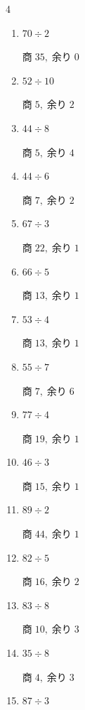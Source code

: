 \begin{multicols}{4}
\begin{enumerate}
        $商\; 2,\; 余り\; 3$

  \item $70 \div 2$

        $商\; 35,\; 余り\; 0$

  \item $52 \div 10$

        $商\; 5,\; 余り\; 2$

  \item $44 \div 8$

        $商\; 5,\; 余り\; 4$

  \item $44 \div 6$

        $商\; 7,\; 余り\; 2$

  \item $67 \div 3$

        $商\; 22,\; 余り\; 1$

  \item $66 \div 5$

        $商\; 13,\; 余り\; 1$

  \item $53 \div 4$

        $商\; 13,\; 余り\; 1$

  \item $55 \div 7$

        $商\; 7,\; 余り\; 6$

  \item $77 \div 4$

        $商\; 19,\; 余り\; 1$

\columnbreak %

  \item $46 \div 3$

        $商\; 15,\; 余り\; 1$

  \item $89 \div 2$

        $商\; 44,\; 余り\; 1$

  \item $82 \div 5$

        $商\; 16,\; 余り\; 2$

  \item $83 \div 8$

        $商\; 10,\; 余り\; 3$

  \item $35 \div 8$

        $商\; 4,\; 余り\; 3$

  \item $87 \div 3$


\end{enumerate}
\end{multicols}
